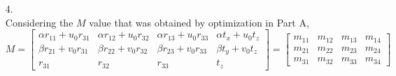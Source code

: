 \documentclass[12pt]{report}
\begin{document}
\begin{enumerate}
\begin{enumerate}
    \item[4.]
    \ \\
    Considering the $M$ value that was obtained by optimization in Part A,
    $$
    M = 
    \begin{bmatrix}
    \alpha r_{11} + u_0 r_{31} & \alpha r_{12} + u_0 r_{32} & \alpha r_{13} + u_0 r_{33} & \alpha t_x + u_0 t_z \\
    \beta r_{21} + v_0 r_{31} & \beta r_{22} + v_0 r_{32} & \beta r_{23} + v_0 r_{33} & \beta t_y + v_0 t_z \\
    r_{31} & r_{32} & r_{33} & t_z
    \end{bmatrix} = 
    \begin{bmatrix}
    m_{11} & m_{12} & m_{13} & m_{14} \\
    m_{21} & m_{22} & m_{23} & m_{24} \\
    m_{31} & m_{32} & m_{33} & m_{34}
    \end{bmatrix}
    $$


\end{enumerate}
\end{enumerate}
\end{document}
